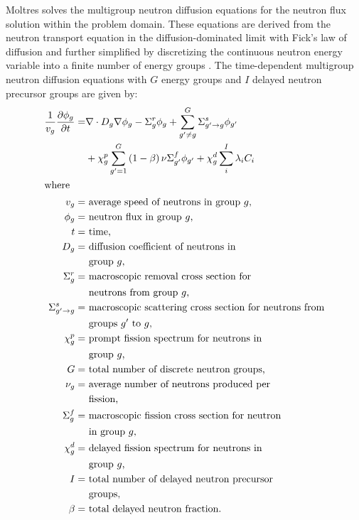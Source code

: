 Moltres solves the multigroup neutron diffusion equations for the neutron
flux solution within the problem domain. These equations are derived from the
neutron transport equation in the diffusion-dominated limit with Fick's law of
diffusion and further simplified by discretizing the continuous neutron energy
variable into a finite number of energy groups \cite{bell_nuclear_1970,
duderstadt_nuclear_1976}. The time-dependent multigroup neutron
diffusion equations with $G$ energy groups and $I$ delayed neutron precursor
groups are given by:
%
\begin{align}
    \frac{1}{v_g} \frac{\partial \phi_g}{\partial t} =& \nabla \cdot D_g
    \nabla \phi_g - \Sigma^r_g \phi_g +
    \sum^G_{g' \neq g} \Sigma^s_{g' \rightarrow g} \phi_{g'} \nonumber \\
    &+ \chi^p_g \sum^G_{g'=1} \left( 1-\beta \right) \nu \Sigma^f_{g'}
    \phi_{g'} + \chi^d_g \sum^I_i \lambda_i C_i \label{eq:neutron} \\
    \shortintertext{where}
    v_g =& \text{ average speed of neutrons in group $g$,} 
    \nonumber \\
    \phi_g =& \text{ neutron flux in group $g$,}
    \nonumber \\
    t =& \text{ time,} \nonumber \\
    D_g =& \text{ diffusion coefficient of neutrons in} \nonumber \\
    &\text{ group $g$,} \nonumber \\
    \Sigma^r_g =& \text{ macroscopic removal cross section for} \nonumber \\
    &\text{ neutrons from group $g$,} \nonumber \\
    \Sigma^s_{g' \rightarrow g} =& \text{ macroscopic scattering cross section
    for neutrons from} \nonumber \\
    &\text{ groups $g'$ to $g$,} \nonumber \\
    \chi^p_g =& \text{ prompt fission spectrum for neutrons in} \nonumber \\
    &\text{ group $g$,} \nonumber \\
    G =& \text{ total number of discrete neutron groups,} \nonumber \\
    \nu_g =& \text{ average number of neutrons produced per} \nonumber \\
    &\text{ fission,} \nonumber \\
    \Sigma^f_{g} =& \text{ macroscopic fission cross section for neutron}
    \nonumber \\
    &\text{ in group $g$,} \nonumber \\
    \chi^d_g =& \text{ delayed fission spectrum for neutrons in} \nonumber \\
    &\text{ group $g$,} \nonumber \\
    I =& \text{ total number of delayed neutron precursor} \nonumber \\
    &\text{ groups,} \nonumber \\
    \beta =& \text{ total delayed neutron fraction.} \nonumber
\end{align}

